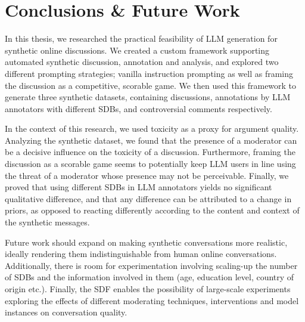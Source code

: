 %
\chapter{Conclusions \& Future Work}
\label{sec:conclusions}

In this thesis, we researched the practical feasibility of LLM generation for synthetic online discussions. We created a custom framework supporting automated synthetic discussion, annotation and analysis, and explored two different prompting strategies; vanilla instruction prompting as well as framing the discussion as a competitive, scorable game. We then used this framework to generate three synthetic datasets, containing discussions, annotations by LLM annotators with different \acp{SDB}, and controversial comments respectively. 

In the context of this research, we used toxicity as a proxy for argument quality. Analyzing the synthetic dataset, we found that the presence of a moderator can be a decisive influence on the toxicity of a discussion. Furthermore, framing the discussion as a scorable game seems to potentially keep LLM users in line using the threat of a moderator whose presence may not be perceivable. Finally, we proved that using different SDBs in LLM annotators yields no significant qualitative difference, and that any difference can be attributed to a change in priors, as opposed to reacting differently according to the content and context of the synthetic messages.

Future work should expand on making synthetic conversations more realistic, ideally rendering them indistinguishable from human online conversations. Additionally, there is room for experimentation involving scaling-up the number of SDBs and the information involved in them (age, education level, country of origin etc.). Finally, the \ac{SDF} enables the possibility of large-scale experiments exploring the effects of different moderating techniques, interventions and model instances on conversation quality.

